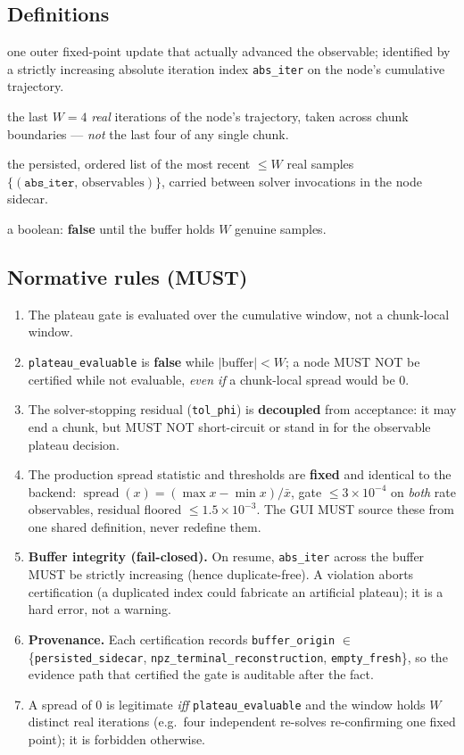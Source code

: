 \documentclass[11pt]{article}
\newcommand{\code}[1]{\texttt{#1}}
\begin{document}
\subsection{Definitions}
\begin{description}[leftmargin=1.4em,style=nextline]
\item[Real iteration] one outer fixed-point update that actually advanced the observable; identified by
a strictly increasing absolute iteration index \code{abs\_iter} on the node's cumulative trajectory.
\item[Cumulative window] the last $W{=}4$ \emph{real} iterations of the node's trajectory, taken across
chunk boundaries --- \emph{not} the last four of any single chunk.
\item[Rolling buffer] the persisted, ordered list of the most recent $\le W$ real samples
$\{(\code{abs\_iter},\,\text{observables})\}$, carried between solver invocations in the node sidecar.
\item[\code{plateau\_evaluable}] a boolean: \textbf{false} until the buffer holds $W$ genuine samples.
\end{description}

\subsection{Normative rules (MUST)}
\begin{enumerate}[leftmargin=1.6em]
\item The plateau gate is evaluated over the cumulative window, not a chunk-local window.
\item \code{plateau\_evaluable} is \textbf{false} while $\lvert\text{buffer}\rvert < W$; a node MUST NOT
be certified while not evaluable, \emph{even if} a chunk-local spread would be $0$.
\item The solver-stopping residual (\code{tol\_phi}) is \textbf{decoupled} from acceptance: it may end a
chunk, but MUST NOT short-circuit or stand in for the observable plateau decision.
\item The production spread statistic and thresholds are \textbf{fixed} and identical to the backend:
$\operatorname{spread}(x)=(\max x-\min x)/\bar x$, gate $\le 3\times10^{-4}$ on \emph{both} rate
observables, residual floored $\le 1.5\times10^{-3}$. The GUI MUST source these from one shared
definition, never redefine them.
\item \textbf{Buffer integrity (fail-closed).} On resume, \code{abs\_iter} across the buffer MUST be
strictly increasing (hence duplicate-free). A violation aborts certification (a duplicated index could
fabricate an artificial plateau); it is a hard error, not a warning.
\item \textbf{Provenance.} Each certification records \code{buffer\_origin} $\in$
\{\code{persisted\_sidecar}, \code{npz\_terminal\_reconstruction}, \code{empty\_fresh}\}, so the evidence
path that certified the gate is auditable after the fact.
\item A spread of $0$ is legitimate \emph{iff} \code{plateau\_evaluable} and the window holds $W$ distinct
real iterations (e.g.\ four independent re-solves re-confirming one fixed point); it is forbidden
otherwise.
\end{enumerate}
\end{document}
